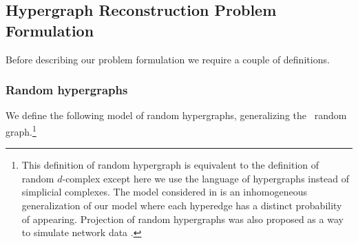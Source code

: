 

\subsection{Hypergraph Reconstruction Problem Formulation}
Before describing our problem formulation we require a couple of definitions.

\subsubsection{Random hypergraphs}
We define the following model of random hypergraphs, generalizing the \ER\ random graph.\footnote{This definition of random hypergraph is equivalent to the definition of random $d$-complex \cite{toth2017handbook} except here we use the language of hypergraphs instead of simplicial complexes. The model considered in \cite{young2021hypergraph} is an inhomogeneous generalization of our model where each hyperedge has a distinct probability of appearing. Projection of random hypergraphs was also proposed as a way to simulate network data \cite{williamson2020random}. 
}

